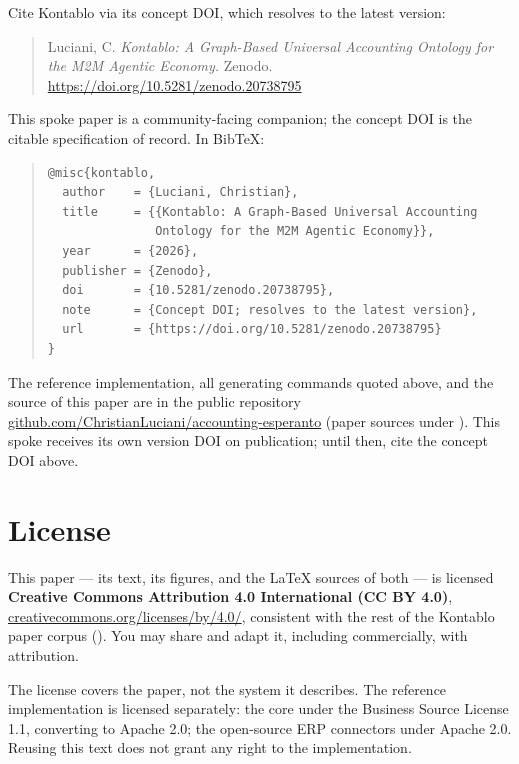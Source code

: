 \documentclass[11pt]{clapps}  %
\begin{document}
Cite Kontablo via its concept DOI, which resolves to the latest version:

\begin{quote}\small
Luciani, C. \emph{Kontablo: A Graph-Based Universal Accounting Ontology for the
M2M Agentic Economy.} Zenodo. \href{https://doi.org/10.5281/zenodo.20738795}{https://doi.org/10.5281/zenodo.20738795}
\end{quote}

\noindent This spoke paper is a community-facing companion; the concept DOI is
the citable specification of record. In BibTeX:

\begin{quote}\footnotesize
\begin{verbatim}
@misc{kontablo,
  author    = {Luciani, Christian},
  title     = {{Kontablo: A Graph-Based Universal Accounting
               Ontology for the M2M Agentic Economy}},
  year      = {2026},
  publisher = {Zenodo},
  doi       = {10.5281/zenodo.20738795},
  note      = {Concept DOI; resolves to the latest version},
  url       = {https://doi.org/10.5281/zenodo.20738795}
}
\end{verbatim}
\end{quote}

\noindent The reference implementation, all generating commands quoted above,
and the source of this paper are in the public repository
\href{https://github.com/ChristianLuciani/accounting-esperanto}{github.com/ChristianLuciani/accounting-esperanto}
(paper sources under ). This
spoke receives its own version DOI on publication; until then, cite the concept
DOI above.

\section*{License}

This paper --- its text, its figures, and the \LaTeX{} sources of both --- is
licensed \textbf{Creative Commons Attribution 4.0 International (CC BY 4.0)},
\href{https://creativecommons.org/licenses/by/4.0/}{creativecommons.org/licenses/by/4.0/},
consistent with the rest of the Kontablo paper corpus
(). You may share and adapt it, including
commercially, with attribution.

The license covers the paper, not the system it describes. The reference
implementation is licensed separately: the core under the Business Source
License 1.1, converting to Apache 2.0; the open-source ERP connectors under
Apache 2.0. Reusing this text does not grant any right to the implementation.



\end{document}

